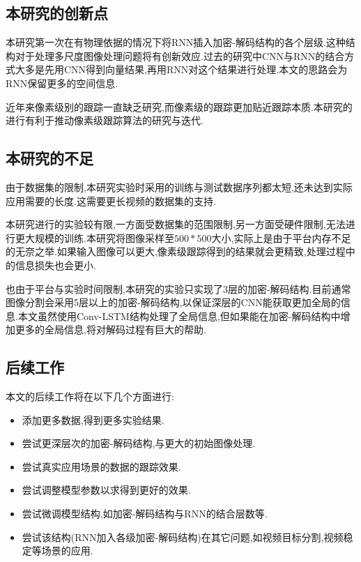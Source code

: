 \subsection{本研究的创新点}
本研究第一次在有物理依据的情况下将RNN插入加密-解码结构的各个层级.这种结构对于处理多尺度图像处理问题将有创新效应.过去的研究中CNN与RNN的结合方式大多是先用CNN得到向量结果,再用RNN对这个结果进行处理.本文的思路会为RNN保留更多的空间信息.
\par
近年来像素级别的跟踪一直缺乏研究,而像素级的跟踪更加贴近跟踪本质.本研究的进行有利于推动像素级跟踪算法的研究与迭代.
\subsection{本研究的不足}
由于数据集的限制,本研究实验时采用的训练与测试数据序列都太短,还未达到实际应用需要的长度.这需要更长视频的数据集的支持.
\par
本研究进行的实验较有限,一方面受数据集的范围限制,另一方面受硬件限制,无法进行更大规模的训练.本研究将图像采样至$500*500$大小,实际上是由于平台内存不足的无奈之举.如果输入图像可以更大,像素级跟踪得到的结果就会更精致,处理过程中的信息损失也会更小.
\par
也由于平台与实验时间限制,本研究的实验只实现了3层的加密-解码结构.目前通常图像分割会采用5层以上的加密-解码结构,以保证深层的CNN能获取更加全局的信息.本文虽然使用Conv-LSTM结构处理了全局信息,但如果能在加密-解码结构中增加更多的全局信息,将对解码过程有巨大的帮助.
\subsection{后续工作}
本文的后续工作将在以下几个方面进行:
\begin{itemize}
    \item 添加更多数据,得到更多实验结果.
    \item 尝试更深层次的加密-解码结构,与更大的初始图像处理.
    \item 尝试真实应用场景的数据的跟踪效果.
    \item 尝试调整模型参数以求得到更好的效果.
    \item 尝试微调模型结构,如加密-解码结构与RNN的结合层数等.
    \item 尝试该结构(RNN加入各级加密-解码结构)在其它问题,如视频目标分割,视频稳定\supercite{benchme}等场景的应用.
\end{itemize}


